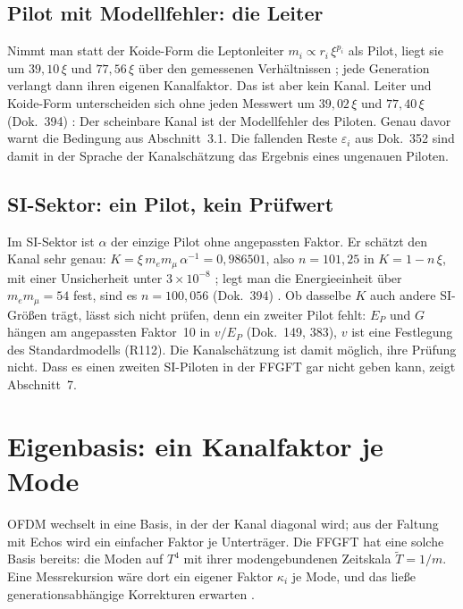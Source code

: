 \subsection{Pilot mit Modellfehler: die Leiter}

Nimmt man statt der Koide-Form die Leptonleiter $m_i\propto r_i\,\xi^{p_i}$ als Pilot, liegt sie um
$39{,}10\,\xi$ und $77{,}56\,\xi$ über den gemessenen Verhältnissen \KM; jede Generation verlangt dann
ihren eigenen Kanalfaktor. Das ist aber kein Kanal. Leiter und Koide-Form unterscheiden sich ohne
jeden Messwert um $39{,}02\,\xi$ und $77{,}40\,\xi$ (Dok.~394) \KM: Der scheinbare Kanal ist der
Modellfehler des Piloten. Genau davor warnt die Bedingung aus Abschnitt~3.1. Die fallenden Reste
$\varepsilon_i$ aus Dok.~352 sind damit in der Sprache der Kanalschätzung das Ergebnis eines
ungenauen Piloten.

\subsection{SI-Sektor: ein Pilot, kein Prüfwert}

Im SI-Sektor ist $\alpha$ der einzige Pilot ohne angepassten Faktor. Er schätzt den Kanal sehr genau:
$K=\xi\,m_em_\mu\,\alpha^{-1}=0{,}986501$, also $n=101{,}25$ in $K=1-n\,\xi$, mit einer Unsicherheit
unter $3\times10^{-8}$ \KM; legt man die Energieeinheit über $m_em_\mu=54$ fest, sind es $n=100{,}056$
(Dok.~394) \KM. Ob dasselbe $K$ auch andere SI-Größen trägt, lässt sich nicht prüfen, denn ein zweiter
Pilot fehlt: $E_P$ und $G$ hängen am angepassten Faktor~10 in $v/E_P$ (Dok.~149, 383), $v$ ist eine
Festlegung des Standardmodells (R112). Die Kanalschätzung ist damit möglich, ihre Prüfung nicht. Dass es
einen zweiten SI-Piloten in der FFGFT gar nicht geben kann, zeigt Abschnitt~7.

\section{Eigenbasis: ein Kanalfaktor je Mode}

OFDM wechselt in eine Basis, in der der Kanal diagonal wird; aus der Faltung mit Echos wird ein
einfacher Faktor je Unterträger. Die FFGFT hat eine solche Basis bereits: die Moden auf $T^4$ mit ihrer
modengebundenen Zeitskala $\tilde T=1/m$. Eine Messrekursion wäre dort ein eigener Faktor $\kappa_i$ je
Mode, und das ließe generationsabhängige Korrekturen erwarten \SM.

